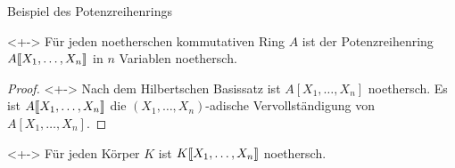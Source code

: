\begin{frame}{Beispiel des Potenzreihenrings}
	\begin{corollary}<+->
		Für jeden noetherschen kommutativen Ring \(A\) ist der Potenzreihenring \(A\llbracket X_1, \dotsc, X_n\rrbracket\) in \(n\)
		Variablen noethersch.
	\end{corollary}
	\begin{proof}<+->
		Nach dem Hilbertschen Basissatz ist \(A[X_1, \dotsc, X_n]\) noethersch. Es ist \(A\llbracket X_1, \dotsc, X_n\rrbracket\) die
		\((X_1, \dotsc, X_n)\)-adische Vervollständigung von \(A[X_1, \dotsc, X_n]\).
	\end{proof}
	\begin{example}<+->
		Für jeden Körper \(K\) ist \(K\llbracket X_1, \dotsc, X_n\rrbracket\) noethersch.
	\end{example}
\end{frame}

